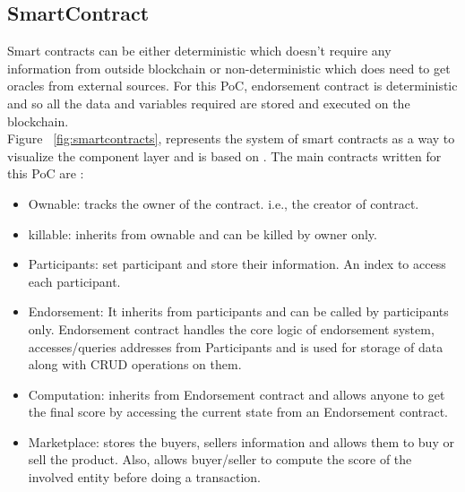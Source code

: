 
\subsection{SmartContract} 
Smart contracts can be either deterministic which doesn't require any
information from outside blockchain or non-deterministic which does need to get
oracles from external sources\cite{alharby2017blockchain}. For this PoC,
endorsement contract is deterministic and so all the data and variables
required are stored and executed on the blockchain. \\
Figure ~\ref{fig:smartcontracts}, represents the system of smart contracts as a
way to visualize the component layer and is based on \cite{delmolino2016step}. 
The main contracts written for this PoC are : 
\begin{itemize}
	\item Ownable: tracks the owner of the contract. i.e., the creator of
		contract. 
	\item killable: inherits from ownable and can be killed by owner only. 
	\item Participants: set participant and store their information. An index
		to access each participant. 
	\item Endorsement: It inherits from participants and can be called by
		participants only. Endorsement contract handles the core logic of
		endorsement system, accesses/queries addresses from Participants and is
		used for storage of data along with CRUD operations on them.  
	\item Computation: inherits from Endorsement contract and allows anyone to
		get the final score by accessing the current state from an Endorsement
		contract.
	\item Marketplace: stores the buyers, sellers information and allows them
		to buy or sell the product. Also, allows buyer/seller to compute the
		score of the involved entity before doing a transaction.  
\end{itemize}

